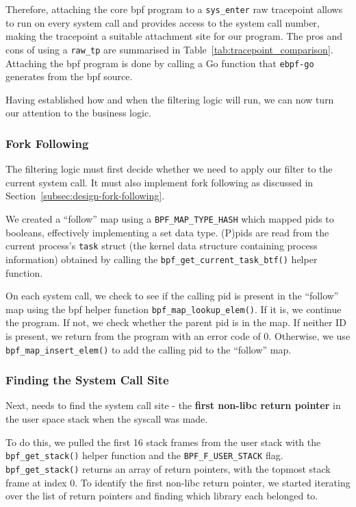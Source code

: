 Therefore, attaching the core \ac{bpf} program to a \texttt{sys\_enter} raw
tracepoint allows \af to run on every system call and provides access to the
system call number, making the tracepoint a suitable attachment site for our
program. The pros and cons of using a \texttt{raw\_tp} are summarised in
Table~\ref{tab:tracepoint_comparison}. Attaching the \ac{bpf} program is done by calling a Go function that
\texttt{ebpf-go} generates from the \ac{bpf} source. 

Having established how and when the \af filtering logic will run, we can now
turn our attention to the business logic.

\subsubsection{Fork Following}

The filtering logic must first decide whether we
need to apply our filter to the current system call. It must also implement fork
following as discussed in Section~\ref{subsec:design-fork-following}. 

We created a ``follow'' map using a \texttt{BPF\_MAP\_TYPE\_HASH} which mapped
\ac{pid}s to booleans, effectively implementing a set data type. (P)\acp{pid}
are read from the current process's \texttt{task} struct (the kernel data
structure containing process information) obtained by calling the
\texttt{bpf\_get\_current\_task\_btf()} helper function. 

On each system call, we check to see if the calling \ac{pid} is present in the
``follow'' map using the \ac{bpf} helper function \texttt{bpf\_map\_lookup\_elem()}.
If it is, we continue the program. If not, we check whether
the parent \ac{pid} is in the map. If neither ID is present,
we return from the program with an error code of 0. Otherwise, we
use \texttt{bpf\_map\_insert\_elem()} to add the calling \ac{pid} to
the  ``follow'' map.

\subsubsection{Finding the System Call Site}\label{subsec:impl-syscall-site}

Next, \af needs to find the system call site - the \textbf{first non-\ac{libc} return pointer} in the user space stack when the syscall was made.

To do this, we pulled the first 16 stack frames from the user stack with the 
\texttt{bpf\_get\_stack()} helper function and the \texttt{BPF\_F\_USER\_STACK}
flag. \texttt{bpf\_get\_stack()} returns an array of return pointers, with the
topmost stack frame at index 0. To identify the first non-\ac{libc} return pointer, we started iterating over
the list of return pointers and finding which library each belonged to.

